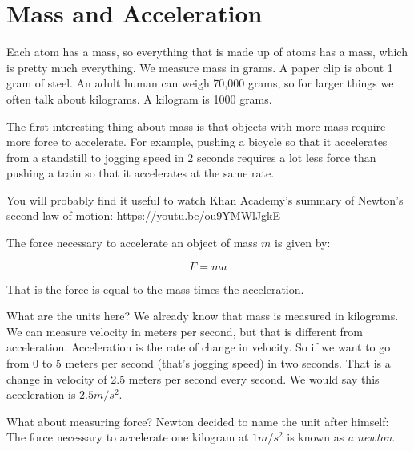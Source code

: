 \section{Mass and Acceleration}

Each atom has a mass, so everything that is made up of atoms has a
mass, which is pretty much everything.  We measure mass in grams.  A
paper clip is about 1 gram of steel. An adult human can weigh 70,000
grams, so for larger things we often talk about kilograms. A kilogram
is 1000 grams.

The first interesting thing about mass is that objects with more mass
require more force to accelerate. For example, pushing a bicycle so
that it accelerates from a standstill to jogging speed in 2 seconds
requires a lot less force than pushing a train so that it accelerates
at the same rate.

You will probably find it useful to watch Khan Academy's summary of
Newton's second law of motion: \url{https://youtu.be/ou9YMWlJgkE}

\begin{mdframed}[style=important, frametitle={Newton's Second Law of Motion}]

The force necessary to accelerate an object of mass $m$ is given by:

$$F = m a$$

That is the force is equal to the mass times the acceleration.

\end{mdframed}

What are the units here? We already know that mass is measured in
kilograms. We can measure velocity in meters per second, but that is
different from acceleration. Acceleration is the rate of change in
velocity. So if we want to go from 0 to 5 meters per second (that's
jogging speed) in two seconds. That is a change in velocity of 2.5
meters per second every second. We would say this acceleration is $2.5
m/s^2$.

What about measuring force? Newton decided to name the unit after
himself: The force necessary to accelerate one kilogram at $1 m/s^2$
is known as \textit{a newton}.

